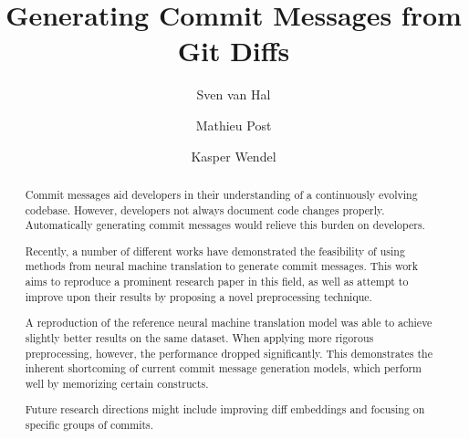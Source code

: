 \documentclass[sigconf]{acmart}
\begin{document}
\title{Generating Commit Messages from Git Diffs}

\author{Sven van Hal}
 
 \author{Mathieu Post}

\author{Kasper Wendel}


\begin{abstract}
Commit messages aid developers in their understanding of a continuously evolving codebase. However, developers not always document code changes properly. Automatically generating commit messages would relieve this burden on developers.

Recently, a number of different works have demonstrated the feasibility of using methods from neural machine translation to generate commit messages. This work aims to reproduce a prominent research paper in this field, as well as attempt to improve upon their results by proposing a novel preprocessing technique.

A reproduction of the reference neural machine translation model was able to achieve slightly better results on the same dataset. When applying more rigorous preprocessing, however, the performance dropped significantly. This demonstrates the inherent shortcoming of current commit message generation models, which perform well by memorizing certain constructs.

Future research directions might include improving diff embeddings and focusing on specific groups of commits.
\end{abstract}



\pagestyle{plain}
\maketitle














\end{document}

